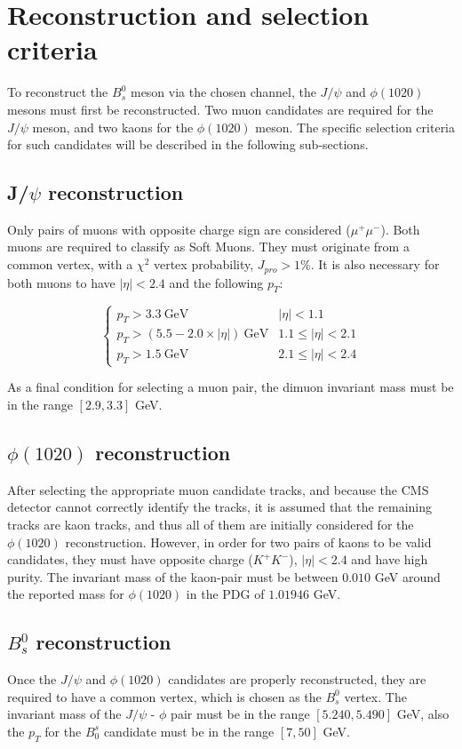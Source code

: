 \section{Reconstruction and selection criteria}%
To reconstruct the $B^0_s$ meson via the chosen channel, the $J/\psi$ and $\phi (1020)$ mesons must first be reconstructed. Two muon candidates are required for the $J/\psi$ meson, and two kaons for the $\phi (1020)$ meson. The specific selection criteria for such candidates will be described in the following sub-sections.
\subsection{J/$\psi$ reconstruction}

Only pairs of muons with opposite charge sign are considered ($\mu^{+}\mu^{-}$). Both muons are required to classify as Soft Muons. They must originate from a common vertex, with a  $\chi^2$ vertex probability, $J_{pro} > 1\%$. It is also necessary for both muons to have $|\eta| < 2.4$ and the following $p_T$:

\[ \begin{cases} 
	p_T > 3.3 \ \text{GeV} & |\eta| < 1.1 \\
	p_T > \left(5.5 - 2.0 \times |\eta|\right) \ \text{GeV} & 1.1 \leq |\eta| < 2.1 \\
	p_T > 1.5 \ \text{GeV} & 2.1 \leq |\eta| < 2.4 
\end{cases}
\] 

As a final condition for selecting a muon pair, the dimuon invariant mass must be in the range $[2.9, 3.3]$ GeV.
\subsection{$\phi(1020)$ reconstruction}
After selecting the appropriate muon candidate tracks, and because the CMS detector cannot correctly identify the tracks, it is assumed that the remaining tracks are kaon tracks, and thus all of them are initially considered for the $\phi(1020)$ reconstruction. However, in order for two pairs of kaons to be valid candidates, they must have opposite charge ($K^{+}K^{-}$), $|\eta| < 2.4$ and have high purity. The invariant mass of the kaon-pair must be between $0.010$ GeV around the reported mass for $\phi(1020)$ in the PDG of $1.01946$ GeV.
\subsection{$B_s^0$ reconstruction}
Once the $J/\psi$ and $\phi(1020)$ candidates are properly reconstructed, they are required to have a common vertex, which is chosen as the $B_s^0$ vertex. The invariant mass of the $J/\psi$ - $\phi$ pair must be in the range $[5.240, 5.490]$ GeV, also the $p_T$ for the $B_0^s$ candidate must be in the range $[7, 50]$ GeV. 

